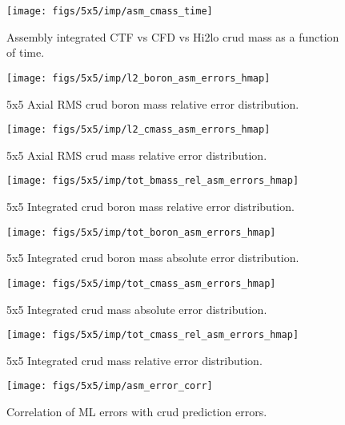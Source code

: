 \begin{figure}[H]
    \centering
    \texttt{[image: figs/5x5/imp/asm\_cmass\_time]}
    \caption{Assembly integrated CTF vs CFD vs Hi2lo crud mass as a function of time.}
    \label{fig:asmcmasstime}
\end{figure}

\begin{figure}[H]
    \centering
    \texttt{[image: figs/5x5/imp/l2\_boron\_asm\_errors\_hmap]}
    \caption{5x5 Axial RMS crud boron mass relative error distribution.}
    \label{fig:l2boronasmerrorshmap}
\end{figure}
\begin{figure}[H]
    \centering
    \texttt{[image: figs/5x5/imp/l2\_cmass\_asm\_errors\_hmap]}
    \caption{5x5 Axial RMS crud mass relative error distribution.}
    \label{fig:l2cmassasmerrorshmap}
\end{figure}


\begin{figure}[H]
    \centering
    \texttt{[image: figs/5x5/imp/tot\_bmass\_rel\_asm\_errors\_hmap]}
    \caption{5x5 Integrated crud boron mass relative error distribution.}
    \label{fig:totbmassrelasmerrorshmap}
\end{figure}
\begin{figure}[H]
    \centering
    \texttt{[image: figs/5x5/imp/tot\_boron\_asm\_errors\_hmap]}
    \caption{5x5 Integrated crud boron mass absolute error distribution.}
    \label{fig:totboronasmerrorshmap}
\end{figure}
\begin{figure}[H]
    \centering
    \texttt{[image: figs/5x5/imp/tot\_cmass\_asm\_errors\_hmap]}
    \caption{5x5 Integrated crud mass absolute error distribution.}
    \label{fig:totcmassasmerrorshmap}
\end{figure}
\begin{figure}[H]
    \centering
    \texttt{[image: figs/5x5/imp/tot\_cmass\_rel\_asm\_errors\_hmap]}
    \caption{5x5 Integrated crud mass relative error distribution.}
    \label{fig:totcmassrelasmerrorshmap}
\end{figure}

\begin{figure}[H]
    \centering
    \texttt{[image: figs/5x5/imp/asm\_error\_corr]}
    \caption{Correlation of ML errors with crud prediction errors.}
    \label{fig:asmerrorcorr}
\end{figure}

